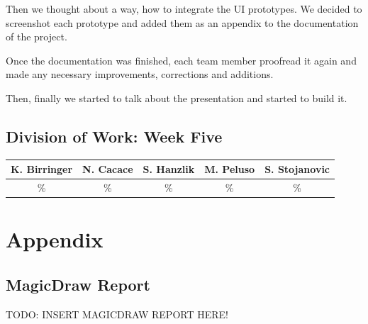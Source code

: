 \documentclass[a4paper, 12pt]{article}
\begin{document}
Then we thought about a way, how to integrate the UI prototypes. We decided to screenshot each prototype and added them as an appendix to the documentation of the project.

Once the documentation was finished, each team member proofread it again and made any necessary improvements, corrections and additions.

Then, finally we started to talk about the presentation and started to build it.

\subsection{Division of Work: Week Five}

\begin{table}[htbp]
\centering
\setlength{\tabcolsep}{10pt}
\begin{tabular}{|c|c|c|c|c|}
\hline
K. Birringer & N. Cacace & S. Hanzlik & M. Peluso & S. Stojanovic\\
\hline
\% & \% & \% & \% & \% \\ 
\hline
\end{tabular}
\end{table}
\newpage
\section{Appendix}

\subsection{MagicDraw Report}
\color{red}TODO: INSERT MAGICDRAW REPORT HERE!\color{black}

\newpage
\end{document}
